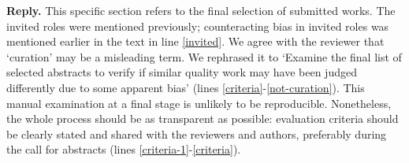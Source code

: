 \documentclass{article}
\newenvironment{Reply}{\noindent\color{BlueViolet}\textbf{Reply.}}{\vspace{1em}}
\begin{document}
\begin{Reply}
This specific section refers to the final selection of submitted works. The invited roles were mentioned previously; counteracting bias in invited roles was mentioned earlier in the text in line \ref{invited}.
We agree with the reviewer that `curation' may be a misleading term.
We rephrased it to `Examine the final list of selected abstracts to verify if similar quality work may have been judged differently due to some apparent bias' (lines \ref{criteria}-\ref{not-curation}). 
This manual examination at a final stage is unlikely to be reproducible. Nonetheless, the whole process should be as transparent as possible: evaluation criteria should be clearly stated and shared with the reviewers and authors, preferably during the call for abstracts (lines \ref{criteria-1}-\ref{criteria}).

   
   

\end{Reply}
\end{document}
